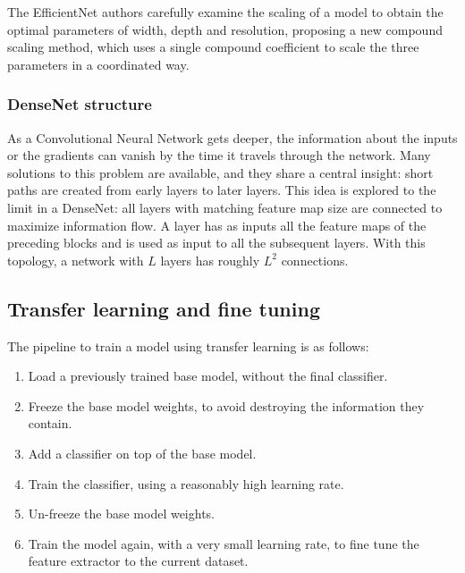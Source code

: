 The EfficientNet authors carefully examine the scaling of a model to obtain the
optimal parameters of width, depth and resolution, proposing a new compound
scaling method, which uses a single compound coefficient to scale the three
parameters in a coordinated way.

\subsubsection{DenseNet structure}

As a Convolutional Neural Network gets deeper, the information about the inputs
or the gradients can vanish by the time it travels through the network.
Many solutions to this problem are available, and they share a central insight:
short paths are created from early layers to later layers.
This idea is explored to the limit in a DenseNet: all layers with matching feature
map size are connected to maximize information flow.
A layer has as inputs all the feature maps of the preceding blocks and is used
as input to all the subsequent layers.
With this topology, a network with $L$ layers has roughly $L^2$ connections.

\subsection{Transfer learning and fine tuning}

The pipeline to train a model using transfer learning is as follows:
\begin{enumerate}
    \item Load a previously trained base model, without the final classifier.
    \item Freeze the base model weights, to avoid destroying the information they
        contain.
    \item Add a classifier on top of the base model.
    \item Train the classifier, using a reasonably high learning rate.
    \item Un-freeze the base model weights.
    \item Train the model again, with a very small learning rate, to fine tune
        the feature extractor to the current dataset.
\end{enumerate}

